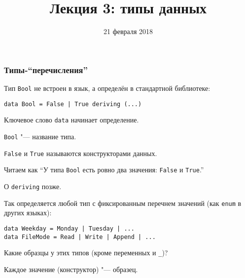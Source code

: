 \documentclass[10pt]{beamer}
\title{Лекция 3: типы данных}
\date{21 февраля 2018}
\begin{document}
\begin{frame}[plain]
\maketitle
\end{frame}

\begin{frame}[fragile]
\frametitle{Типы-\enquote{перечисления}}
\begin{itemize}
    \item Тип \lstinline|Bool| не встроен в язык, а определён в стандартной библиотеке:
\begin{lstlisting}
data Bool = False | True deriving (...)
\end{lstlisting}
    \item Ключевое слово \lstinline|data| начинает определение.
    \item \lstinline|Bool| "--- название типа.
    \item \lstinline|False| и \lstinline|True| называются конструкторами данных.
    \item Читаем как \enquote{У типа \lstinline|Bool| есть ровно два значения: \lstinline|False| и \lstinline|True|.} 
     { \item О \lstinline|deriving| позже. }
    \pause
    \item Так определяется любой тип с фиксированным перечнем значений (как \lstinline|enum| в других языках):
\begin{lstlisting}
data Weekday = Monday | Tuesday | ...
data FileMode = Read | Write | Append | ...
\end{lstlisting}
    \item Какие образцы у этих типов (кроме переменных и \lstinline|_|)? \pause
    \item Каждое значение (конструктор) "--- образец.
\end{itemize}
\end{frame}
\end{document}
